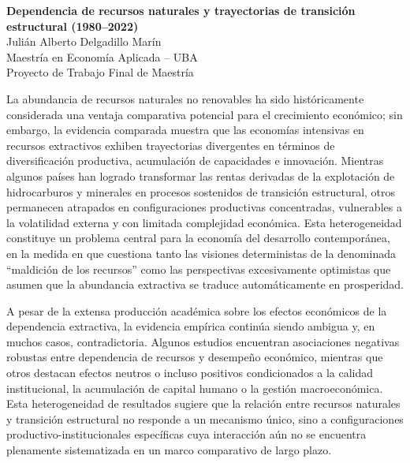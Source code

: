 \documentclass[12pt,a4paper]{article}
\begin{document}
	
	\onehalfspacing
	\justifying
	\setlength{\parindent}{0pt}
	\setlength{\parskip}{0.8em}
	
	\begin{center}
		{\Large \textbf{Dependencia de recursos naturales y trayectorias de transición estructural (1980–2022)}}\\
		\vspace{0.4cm}
		Julián Alberto Delgadillo Marín\\
		Maestría en Economía Aplicada – UBA\\
		Proyecto de Trabajo Final de Maestría
	\end{center}
	
	\vspace{0.8cm}
	
	\vspace{0.8cm}
	
	La abundancia de recursos naturales no renovables ha sido históricamente considerada una ventaja comparativa potencial para el crecimiento económico; sin embargo, la evidencia comparada muestra que las economías intensivas en recursos extractivos exhiben trayectorias divergentes en términos de diversificación productiva, acumulación de capacidades e innovación. Mientras algunos países han logrado transformar las rentas derivadas de la explotación de hidrocarburos y minerales en procesos sostenidos de transición estructural, otros permanecen atrapados en configuraciones productivas concentradas, vulnerables a la volatilidad externa y con limitada complejidad económica. Esta heterogeneidad constituye un problema central para la economía del desarrollo contemporánea, en la medida en que cuestiona tanto las visiones deterministas de la denominada “maldición de los recursos” como las perspectivas excesivamente optimistas que asumen que la abundancia extractiva se traduce automáticamente en prosperidad.
	
	A pesar de la extensa producción académica sobre los efectos económicos de la dependencia extractiva, la evidencia empírica continúa siendo ambigua y, en muchos casos, contradictoria. Algunos estudios encuentran asociaciones negativas robustas entre dependencia de recursos y desempeño económico, mientras que otros destacan efectos neutros o incluso positivos condicionados a la calidad institucional, la acumulación de capital humano o la gestión macroeconómica. Esta heterogeneidad de resultados sugiere que la relación entre recursos naturales y transición estructural no responde a un mecanismo único, sino a configuraciones productivo-institucionales específicas cuya interacción aún no se encuentra plenamente sistematizada en un marco comparativo de largo plazo.
	
\end{document}
